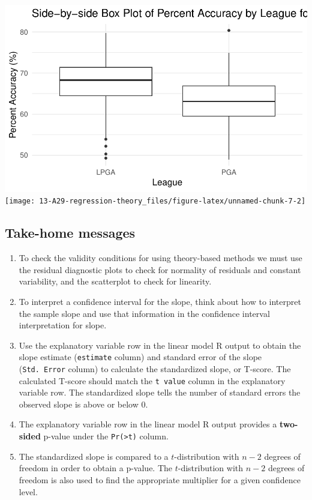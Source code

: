 \documentclass[
]{report}
\begin{document}
\begin{center}\includegraphics[width=0.7\linewidth]{13-A29-regression-theory_files/figure-latex/unnamed-chunk-7-1} \texttt{[image: 13-A29-regression-theory\_files/figure-latex/unnamed-chunk-7-2]} \end{center}

\vspace{0.8in}

\subsection{Take-home messages}\label{take-home-messages-27}

\begin{enumerate}
\def\labelenumi{\arabic{enumi}.}
\item
  To check the validity conditions for using theory-based methods we must use the residual diagnostic plots to check for normality of residuals and constant variability, and the scatterplot to check for linearity.
\item
  To interpret a confidence interval for the slope, think about how to interpret the sample slope and use that information in the confidence interval interpretation for slope.
\item
  Use the explanatory variable row in the linear model R output to obtain the slope estimate (\texttt{estimate} column) and standard error of the slope (\texttt{Std.\ Error} column) to calculate the standardized slope, or T-score. The calculated T-score should match the \texttt{t\ value} column in the explanatory variable row. The standardized slope tells the number of standard errors the observed slope is above or below 0.
\item
  The explanatory variable row in the linear model R output provides a \textbf{two-sided} p-value under the \texttt{Pr(\textgreater{}\textbar{}t\textbar{})} column.
\item
  The standardized slope is compared to a \(t\)-distribution with \(n-2\) degrees of freedom in order to obtain a p-value. The \(t\)-distribution with \(n-2\) degrees of freedom is also used to find the appropriate multiplier for a given confidence level.
\end{enumerate}
\end{document}
